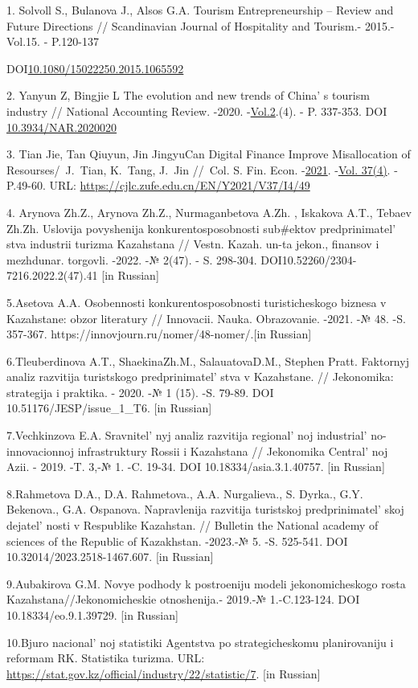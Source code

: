 \begin{references}

1. Solvoll S., Bulanova J., Alsos G.A. Tourism Entrepreneurship --
Review and Future Directions // Scandinavian Journal of Hospitality and
Tourism.- 2015.- Vol.15. - P.120-137

DOI\href{http://dx.doi.org/10.1080/15022250.2015.1065592}{10.1080/15022250.2015.1065592}

2. Yanyun Z, Bingjie L The evolution and new trends of
China' s tourism industry // National Accounting Review.
-2020.
-\href{https://www.aimspress.com/nar/article/archives}{Vol.2}.(4). - P.
337-353. DOI
\href{https://doi.org/10.3934/NAR.2020020}{10.3934/NAR.2020020}

3. Tian Jie, Tan Qiuyun, Jin JingyuCan Digital Finance Improve
Misallocation of Resourses/~J.~Tian, K.~Tang, J.~Jin //~Col. S. Fin.
Econ.
-\href{https://cjlc.zufe.edu.cn/EN/article/showTenYearVolumnDetail.do?nian=2021}{2021}.
-\href{https://cjlc.zufe.edu.cn/EN/article/showTenYearVolumnDetail.do?nian=2021}{Vol.
37}\href{file:///C:/Users/admin/Desktop/Вестник\%20КазУТБ/4\%202024/(4)}{(4)}.
- P.49-60.
URL: \url{https://cjlc.zufe.edu.cn/EN/Y2021/V37/I4/49}

4. Arynova Zh.Z., Arynova Zh.Z., Nurmaganbetova A.Zh. , Iskakova A.T.,
Tebaev Zh.Zh. Uslovija povyshenija konkurentosposobnosti sub\#ektov
predprinimatel' stva industrii turizma Kazahstana //
Vestn. Kazah. un-ta jekon., finansov i mezhdunar. torgovli. -2022. -№
2(47). - S. 298-304. DOI10.52260/2304-7216.2022.2(47).41 {[}in
Russian{]}

5.Asetova A.A. Osobennosti konkurentosposobnosti turisticheskogo biznesa
v Kazahstane: obzor literatury // Innovacii. Nauka. Obrazovanie. -2021.
-№ 48. -S. 357-367.
https://innovjourn.ru/nomer/48-nomer/.{[}in Russian{]}

6.Tleuberdinova A.T., ShaekinaZh.M., SalauatovaD.M., Stephen Pratt.
Faktornyj analiz razvitija turistskogo
predprinimatel' stva v Kazahstane. // Jekonomika:
strategija i praktika. - 2020. -№ 1 (15). -S. 79-89. DOI
10.51176/JESP/issue\_1\_T6. {[}in Russian{]}

7.Vechkinzova E.A. Sravnitel' nyj analiz razvitija
regional' noj industrial' no-innovacionnoj
infrastruktury Rossii i Kazahstana // Jekonomika
Central' noj Azii. - 2019. -T. 3,-№ 1. -C. 19-34. DOI
10.18334/asia.3.1.40757. {[}in Russian{]}

8.Rahmetova D.A., D.A. Rahmetova., A.A. Nurgalieva., S. Dyrka., G.Y.
Bekenova., G.A. Ospanova. Napravlenija razvitija turistskoj
predprinimatel' skoj dejatel' nosti v
Respublike Kazahstan. // Bulletin the National academy of sciences of
the Republic of Kazakhstan. -2023.-№ 5. -S. 525-541. DOI
10.32014/2023.2518-1467.607. {[}in Russian{]}

9.Aubakirova G.M. Novye podhody k postroeniju modeli jekonomicheskogo
rosta Kazahstana//Jekonomicheskie otnoshenija.- 2019.-№ 1.-C.123-124.
DOI 10.18334/eo.9.1.39729. {[}in Russian{]}

10.Bjuro nacional' noj statistiki Agentstva po
strategicheskomu planirovaniju i reformam RK. Statistika turizma. URL:
\url{https://stat.gov.kz/official/industry/22/statistic/7}. {[}in
Russian{]}
\end{references}

